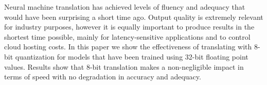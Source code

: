 Neural machine translation has achieved levels of fluency and adequacy that would have been surprising a short time ago. Output quality is extremely relevant for industry purposes, however it is equally important to produce results in the shortest time possible, mainly for latency-sensitive applications and to control cloud hosting costs. In this paper we show the effectiveness of translating with 8-bit quantization for models that have been trained using 32-bit floating point values. Results show that 8-bit translation makes a non-negligible impact in terms of speed with no degradation in accuracy and adequacy.
